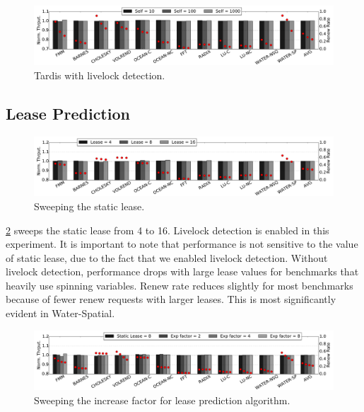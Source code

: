 \documentclass[12pt]{article}
\begin{document}
\begin{figure}
	\centering
	\includegraphics[width=0.95\columnwidth]{figs/selfincr_live.pdf}
	\caption{ Tardis with livelock detection. }
	\label{fig:self-live}
\end{figure}


\subsection{Lease Prediction}                         \label{sec:opt-lease}                       

\begin{figure}
	\centering
	\includegraphics[width=0.95\columnwidth]{figs/static.pdf}
	\caption{ Sweeping the static lease.  }
	\label{fig:static}
\end{figure}


\cref{fig:static} sweeps the static lease from 4 to 16. Livelock 
detection is enabled in this experiment. It is important to note that 
performance is not sensitive to the value of static lease, due to the 
fact that we enabled livelock detection. Without livelock detection, 
performance drops with large lease values for benchmarks that heavily 
use spinning variables. Renew rate reduces slightly for most 
benchmarks because of fewer renew requests with larger leases. This is 
most significantly evident in Water-Spatial.

\begin{figure}
	\centering
	\includegraphics[width=0.95\columnwidth]{figs/exp.pdf}
	\caption{ Sweeping the increase factor for lease prediction 
	algorithm.}
	\label{fig:exp}
\end{figure}
\end{document}
